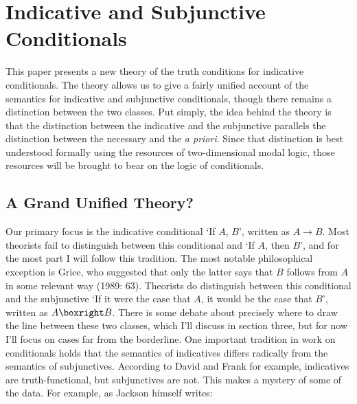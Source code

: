 \newcommand{\numbex}[2]{
\begin{enumerate}
\setcounter{enumi}{#1}
\renewcommand{\labelenumi}{(\arabic{enumi})}
#2
\end{enumerate}
}

\chapter{Indicative and Subjunctive Conditionals}


This paper presents a new theory of the truth conditions for indicative conditionals. The theory allows us to give a fairly unified account of the semantics for indicative and subjunctive conditionals, though there remains a distinction between the two classes. Put simply, the idea behind the theory is that the distinction between the indicative and the subjunctive parallels the distinction between the necessary and the \textit{a priori}. Since that distinction is best understood formally using the resources of two-dimensional modal logic, those resources will be brought to bear on the logic of conditionals.

\section{A Grand Unified Theory?}
Our primary focus is the indicative conditional `If \(A\), \(B\)', written as \(A \rightarrow B\). Most theorists fail to distinguish between this conditional and `If \(A\), then \(B\)', and for the most part I will follow this tradition. The most notable philosophical exception is Grice, who suggested that only the latter says that \(B\) follows from \(A\) in some relevant way (1989: 63). Theorists do distinguish between this conditional and the subjunctive `If it were the case that \(A\), it would be the case that \(B\)', written as \(A \boxright B\). There is some debate about precisely where to draw the line between these two classes, which I'll discuss in section three, but for now I'll focus on cases far from the borderline. One important tradition in work on conditionals holds that the semantics of indicatives differs radically from the semantics of subjunctives. According to David \citet{Lewis1973a, Lewis1976b} and Frank \citet{Jackson1987} for example, indicatives are truth-functional, but subjunctives are not. This makes a mystery of some of the data. For example, as Jackson himself writes:

